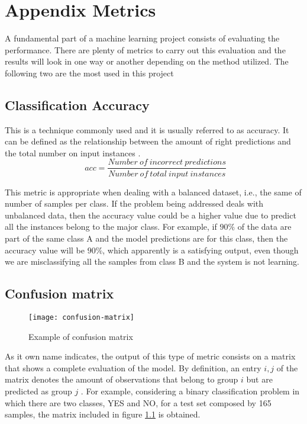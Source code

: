 

\chapter{Appendix Metrics}
\label{appendix:metrics}

	A fundamental part of a machine learning project consists of evaluating the performance. There are plenty of metrics to carry out this evaluation and the results will look in one way or another depending on the method utilized. The following two are the most used in this project
	
\section*{Classification Accuracy}

	This is a technique commonly used and it is usually referred to as accuracy. It can be defined as the relationship between the amount of right predictions and the total number on input instances \cite{Scikit-learn}.
	\[
	\ \ acc = \frac{Number\ of\ incorrect\  predictions}{Number\ of\ total\ input\ instances}
	\]
	
	This metric is appropriate when dealing with a balanced dataset, i.e., the same of number of samples per class.
	If the problem being addressed deals with unbalanced data, then the accuracy value could be a higher value due to predict all the instances belong to the major class. For example, if $90\%$ of the data are part of the same class A and the model predictions are for this class, then the accuracy value will be $90\%$, which apparently is a satisfying output, even though we are misclassifying all the samples from class B \cite{Mishra2018} and the system is not learning. 
	
\section*{Confusion matrix}

	\begin{figure}[b]
		\centering
		\captionsetup{justification=centering}
		\texttt{[image: confusion-matrix]}
		\caption{Example of confusion matrix}
		\label{fig:mesh6}
	\end{figure}

	As it own name indicates, the output of this type of metric consists on a matrix that shows a complete evaluation of the model. By definition, an entry $i,j$ of the matrix denotes the amount of observations that belong to group $i$ but are predicted as group $j$ \cite{Scikit-learn}. For example, considering a binary classification problem in which there are two classes, YES and NO, for a test set composed by 165 samples, the matrix included in figure \ref{fig:mesh6} is obtained. 
	
